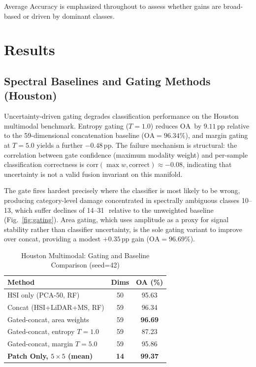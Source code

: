 \documentclass[journal]{IEEEtran}
\newcommand{\pp}{\,\text{pp}}
\newcommand{\OA}{\ensuremath{\mathrm{OA}}}
\begin{document}
Average Accuracy is emphasized throughout to assess whether gains
are broad-based or driven by dominant classes.

\section{Results}
\label{sec:results}

\subsection{Spectral Baselines and Gating Methods (Houston)}

Uncertainty-driven gating degrades classification performance on the
Houston multimodal benchmark. Entropy gating ($T{=}1.0$) reduces \OA\
by $9.11\pp$ relative to the 59-dimensional concatenation baseline
($\OA{=}96.34\%$), and margin gating at $T{=}5.0$ yields a further
$-0.48\pp$. The failure mechanism is structural: the correlation
between gate confidence (maximum modality weight) and per-sample
classification correctness is $\mathrm{corr}(\max w,
\mathrm{correct}) \approx -0.08$, indicating that uncertainty is not
a valid fusion invariant on this manifold.

The gate fires hardest precisely where the classifier is most likely
to be wrong, producing category-level damage concentrated in
spectrally ambiguous classes 10--13, which suffer declines of
14--31\pp\ relative to the unweighted baseline (Fig.~\ref{fig:gating}).
Area gating, which uses amplitude as a proxy for signal stability
rather than classifier uncertainty, is the sole gating variant to
improve over concat, providing a modest $+0.35\pp$ gain ($\OA =
96.69\%$).

\begin{table}[t]
\centering
\caption{Houston Multimodal: Gating and Baseline Comparison (seed=42)}
\label{tab:houston_gating}
\begin{tabular}{lcc}
\toprule
Method & Dims & OA (\%) \\
\midrule
HSI only (PCA-50, RF)          & 50 & 95.63 \\
Concat (HSI+LiDAR+MS, RF)      & 59 & 96.34 \\
Gated-concat, area weights     & 59 & \textbf{96.69} \\
Gated-concat, entropy $T{=}1.0$& 59 & 87.23 \\
Gated-concat, margin $T{=}5.0$ & 59 & 95.86 \\
\midrule
\textbf{Patch Only, $5{\times}5$ (mean)}
                               & \textbf{14} & \textbf{99.37} \\
\bottomrule
\end{tabular}
\end{table}
\end{document}
